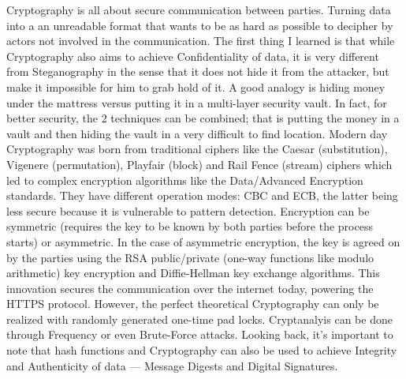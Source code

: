 \documentclass[a4paper]{article}
\begin{document}
Cryptography is all about secure communication between parties. Turning data
into a an unreadable format that wants to be as hard as possible to decipher
by actors not involved in the communication. The first thing I learned is that
while Cryptography also aims to achieve Confidentiality of data, it is very
different from Steganography in the sense that it does not hide it from the
attacker, but make it impossible for him to grab hold of it. A good analogy
is hiding money under the mattress versus putting it in a multi-layer security
vault. In fact, for better security, the 2 techniques can be combined; that is
putting the money in a vault and then hiding the vault in a very difficult
to find location. Modern day Cryptography was born from traditional ciphers like
the Caesar (substitution), Vigenere (permutation), Playfair (block) and Rail
Fence (stream) ciphers which led to complex encryption algorithms like the
Data/Advanced Encryption standards. They have different operation modes: CBC and
ECB, the latter being less secure because it is vulnerable to pattern detection.
Encryption can be symmetric (requires the key to be known by both parties
before the process starts) or asymmetric. In the case of asymmetric encryption,
the key is agreed on by the parties using the RSA public/private (one-way
functions like modulo arithmetic) key encryption and
Diffie-Hellman key exchange algorithms. This innovation secures the
communication over the internet today, powering the HTTPS protocol.
However, the perfect theoretical Cryptography can only be realized with
randomly generated one-time pad locks.
Cryptanalyis can be done through Frequency or even Brute-Force attacks.
Looking back, it's important to note that hash functions and Cryptography can
also be used to achieve Integrity and Authenticity of data --- Message Digests
and Digital Signatures.
\end{document}
